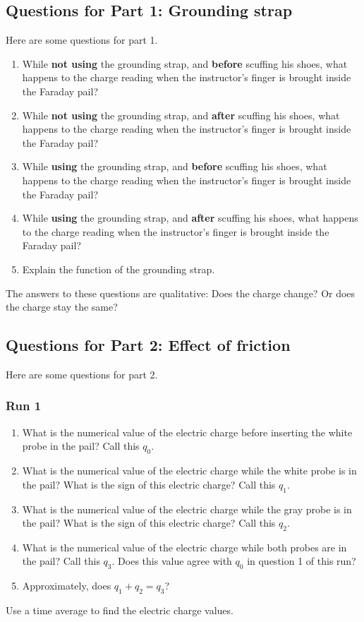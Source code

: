 \subsection{Questions for Part 1: Grounding strap}
%
Here are some questions for part 1.
\begin{enumerate}
	\item While \textbf{not using} the grounding strap, and \textbf{before} scuffing his shoes, what happens to the charge reading when the instructor's finger is brought inside the Faraday pail?
	\item While \textbf{not using} the grounding strap, and \textbf{after} scuffing his shoes, what happens to the charge reading when the instructor's finger is brought inside the Faraday pail?
	\item While \textbf{using} the grounding strap, and \textbf{before} scuffing his shoes, what happens to the charge reading when the instructor's finger is brought inside the Faraday pail?
	\item While \textbf{using} the grounding strap, and \textbf{after} scuffing his shoes, what happens to the charge reading when the instructor's finger is brought inside the Faraday pail?
	\item Explain the function of the grounding strap.
\end{enumerate}
The answers to these questions are qualitative: Does the charge change? Or does the charge stay the same?
%
\subsection{Questions for Part 2: Effect of friction}
%
Here are some questions for part 2.
%
\subsubsection{Run 1}
%
\begin{enumerate}
	\item What is the numerical value of the electric charge before inserting the white probe in the pail? Call this $q_{0}$.
	\item What is the numerical value of the electric charge while the white probe is in the pail? What is the sign of this electric charge? Call this $q_{1}$.
	\item What is the numerical value of the electric charge while the gray probe is in the pail? What is the sign of this electric charge? Call this $q_{2}$.
	\item What is the numerical value of the electric charge while both probes are in the pail? Call this $q_{3}$. Does this value agree with $q_{0}$ in question 1 of this run?
	\item Approximately, does $q_{1} + q_{2} = q_{3}$?
\end{enumerate}
Use a time average to find the electric charge values.
%
